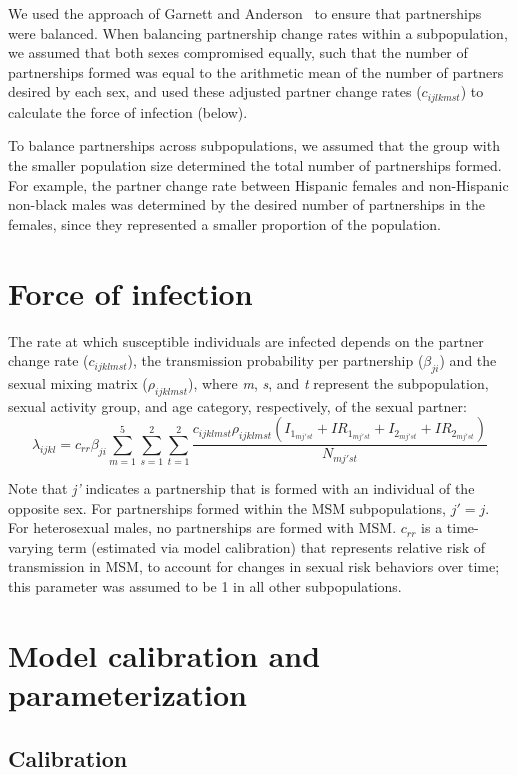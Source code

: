 \documentclass[a4paper]{article}
\begin{document}
We used the approach of Garnett and Anderson~\autocite{Garnett1994} to ensure that partnerships were balanced. When balancing partnership change rates within a subpopulation, we assumed that both sexes compromised equally, such that the number of partnerships formed was equal to the arithmetic mean of the number of partners desired by each sex, and used these adjusted partner change rates ($c_{ijlkmst}$) to calculate the force of infection (below).

To balance partnerships across subpopulations, we assumed that the group with the smaller population size determined the total number of partnerships formed. For example, the partner change rate between Hispanic females and non-Hispanic non-black males was determined by the desired number of partnerships in the females, since they represented a smaller proportion of the population. 

\section{Force of infection}
\label{sec:FOI}
The rate at which susceptible individuals are infected depends on the partner change rate ($c_{ijklmst}$), the transmission probability per partnership ($\beta_{ji}$) and the sexual mixing matrix ($\rho_{ijklmst}$), where \textit{m}, \textit{s}, and \textit{t} represent the subpopulation, sexual activity group, and age category, respectively, of the sexual partner:
\[\lambda_{ijkl} = c_{rr} \beta_{ji} \sum_{m=1}^5 \sum_{s=1}^2 \sum_{t=1}^2 \frac{c_{ijklmst}\rho_{ijklmst}(I_{1_{mj'st}}+IR_{1_{mj'st}} + I_{2_{mj'st}}+IR_{2_{mj'st}})}{N_{mj'st}}\] 

Note that \textit{j'} indicates a partnership that is formed with an individual of the opposite sex. For partnerships formed within the MSM subpopulations, \({j'}=j\). For heterosexual males, no partnerships are formed with MSM. $c_{rr}$ is a time-varying term (estimated via model calibration) that represents relative risk of transmission in MSM, to account for changes in sexual risk behaviors over time; this parameter was assumed to be 1 in all other subpopulations. 

\section{Model calibration and parameterization}
\subsection{Calibration}
\label{subsec:calibration}
\end{document}
